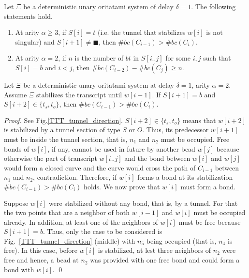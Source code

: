 

\begin{theorem}
\label{TTT}
Let $\Xi$ be a deterministic unary oritatami system of delay $\delta = 1$. The following statements hold.
\begin{enumerate}
\item At arity $\alpha \geq 3$, if $S[i] = t$ (i.e. the tunnel that stabilizes $w[i]$ is not singular) and $S[i+1] \neq \blacksquare$, then $\#bc(C_{i-1}) > \#bc(C_i)$.
\item At arity $\alpha = 2$, if $n$ is the number of $bt$ in $S[i..j]$ for some $i,j$ such that $S[i] = b$ and $i < j$, then $\#bc(C_{i-2}) - \#bc(C_{j}) \geq n$.
\end{enumerate}
\end{theorem}


\begin{lemma}
\label{TTT_entrance_Tab}
Let $\Xi$ be a deterministic unary oritatami system at delay $\delta = 1$, arity $\alpha =2$. 
Assume $\Xi$ stabilizes the transcript until $w[i-1]$. If $S[i+1] = b$ and $S[i+2] \in \{ t_s, t_o \} $, then $\#bc(C_{i-1}) > \#bc(C_{i})$.
\end{lemma}

\begin{proof}%
See Fig.\ref{TTT_tunnel_direction}.
$S[i+2] \in \{ t_s, t_o \} $ means that $w[i+2]$ is stabilized by a tunnel section of type $S$ or $O$.
Thus,  its predecessor $w[i+1]$ must be inside the tunnel section, that is, $n_1$ and $n_2$ must be occupied.
Free bonds of $w[i]$, if any, cannot be used in future by another bead $w[j]$ because otherwise the part of transcript $w[i..j]$ and the bond between $w[i]$ and $w[j]$ would form a closed curve and the curve would cross the path of $C_{i-1}$ between $n_1$ and $n_2$, contradiction.
Therefore, if $w[i]$ forms a bond at its stabilization $\#bc(C_{i-1}) > \#bc(C_{i})$ holds.
We now prove that $w[i]$ must form a bond.


Suppose $w[i]$ were stabilized without any bond, that is, by a tunnel.
For that the two points that are a neighbor of both $w[i-1]$ and $w[i]$ must be occupied already.
In addition, at least one of the neighbors of $w[i]$ must be free because $S[i+1] = b$.
Thus, only the case to be considered is Fig.~\ref{TTT_tunnel_direction} (middle) with $n_5$ being occupied (that is, $n_4$ is free).
In this case, before $w[i]$ is stabilized, at lest three neighbors of $n_2$ were free and hence, a bead at $n_2$ was provided with one free bond and could form a bond with $w[i]$. \qed

\end{proof}

